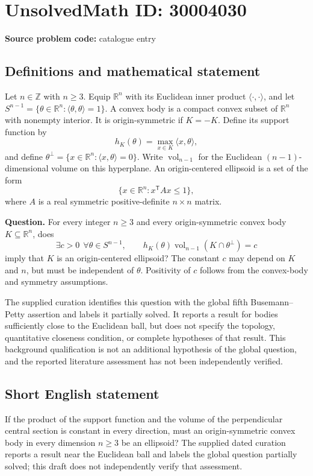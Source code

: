 \documentclass[11pt]{article}
\newcommand{\Z}{\mathbb{Z}}
\newcommand{\R}{\mathbb{R}}
\begin{document}
\section*{UnsolvedMath ID: 30004030}
\textbf{Source problem code:} catalogue entry
\subsection{Definitions and mathematical statement}
Let \(n\in\Z\) with \(n\geq 3\). Equip \(\R^n\) with its Euclidean inner product \(\langle\cdot,\cdot\rangle\), and let \(S^{n-1}=\{\theta\in\R^n:\langle\theta,\theta\rangle=1\}\). A convex body is a compact convex subset of \(\R^n\) with nonempty interior. It is origin-symmetric if \(K=-K\). Define its support function by
\[
h_K(\theta)=\max_{x\in K}\langle x,\theta\rangle,
\]
and define \(\theta^\perp=\{x\in\R^n:\langle x,\theta\rangle=0\}\). Write \(\operatorname{vol}_{n-1}\) for the Euclidean \((n-1)\)-dimensional volume on this hyperplane. An origin-centered ellipsoid is a set of the form
\[
\{x\in\R^n:x^{\mathsf T}Ax\leq 1\},
\]
where \(A\) is a real symmetric positive-definite \(n\times n\) matrix.

\textbf{Question.} For every integer \(n\geq 3\) and every origin-symmetric convex body \(K\subseteq\R^n\), does
\[
\exists c>0\ \ \forall\theta\in S^{n-1},\qquad
h_K(\theta)\operatorname{vol}_{n-1}(K\cap\theta^\perp)=c
\]
imply that \(K\) is an origin-centered ellipsoid? The constant \(c\) may depend on \(K\) and \(n\), but must be independent of \(\theta\). Positivity of \(c\) follows from the convex-body and symmetry assumptions.

The supplied curation identifies this question with the global fifth Busemann--Petty assertion and labels it partially solved. It reports a result for bodies sufficiently close to the Euclidean ball, but does not specify the topology, quantitative closeness condition, or complete hypotheses of that result. This background qualification is not an additional hypothesis of the global question, and the reported literature assessment has not been independently verified.
\subsection{Short English statement}
If the product of the support function and the volume of the perpendicular central section is constant in every direction, must an origin-symmetric convex body in every dimension \(n\geq 3\) be an ellipsoid? The supplied dated curation reports a result near the Euclidean ball and labels the global question partially solved; this draft does not independently verify that assessment.
\end{document}
